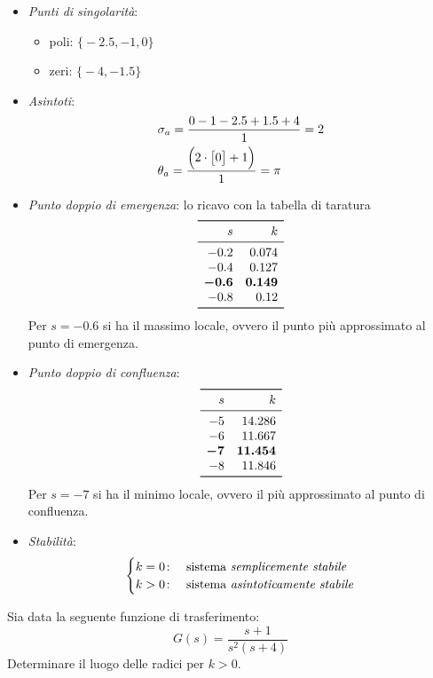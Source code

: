 \begin{itemize}
	\item \emph{Punti di singolarità}:
		\begin{itemize}
			\item poli: \(\bigl\{ -2.5, -1, 0 \bigr\}\)
			\item zeri: \(\bigl\{ -4, -1.5 \bigr\}\)
		\end{itemize}
	\item \emph{Asintoti}:
		\begin{align*}
			& \sigma_a = \frac{0-1-2.5+1.5+4}{1} = 2 \\
			& \theta_a = \frac{\Bigl( 2 \cdot \bigl[0\bigr] +1 \Bigl)}{1} = \pi
		\end{align*}
	\item \emph{Punto doppio di emergenza}:
		lo ricavo con la tabella di taratura
		\[\begin{array}{rr}
			\toprule
			s & k \\
			\midrule
			-0.2 & 0.074 \\
			-0.4 & 0.127 \\
			\bm{-0.6} & \bm{0.149} \\
			-0.8 & 0.12 \\
			\bottomrule
		\end{array}\]
		Per \(s = -0.6\) si ha il massimo locale, ovvero il punto più
		approssimato al punto di emergenza.
	\item \emph{Punto doppio di confluenza}:
		\[\begin{array}{rr}
			\toprule
			s & k \\
			\midrule
			-5 & 14.286 \\
			-6 & 11.667 \\
			\bm{-7} & \bm{11.454} \\
			-8 & 11.846 \\
			\bottomrule
		\end{array}\]
		Per \(s = -7\) si ha il minimo locale, ovvero il più approssimato
		al punto di confluenza.
	\item \emph{Stabilità}:
		\[\begin{cases}
			k = 0\colon & \text{sistema \emph{semplicemente stabile}} \\
			k > 0\colon & \text{sistema \emph{asintoticamente stabile}}
		\end{cases}\]
\end{itemize}


\exercise{}
Sia data la seguente funzione di trasferimento:
\[
	G(s) = \frac{s+1}{s^2 (s+4)}
\]
Determinare il luogo delle radici per \(k>0\).

